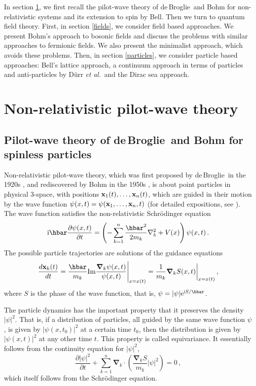 \documentclass[11pt]{article}
\def\pa{\partial}
\def\fr{\frac}
\def\ii{\textrm i}
\def\ee{\textrm e}
\newcommand{\db}{de$\,$Broglie}
\begin{document}
In section \ref{nonrelativistic}, we first recall the pilot-wave theory of \db\ and Bohm for non-relativistic systems and its extension to spin by Bell. Then we turn to quantum field theory. First, in section \ref{fields}, we consider field based approaches. We present Bohm's approach to bosonic fields and discuss the problems with similar approaches to fermionic fields. We also present the minimalist approach, which avoids these problems. Then, in section \ref{particles}, we consider particle based approaches: Bell's lattice approach, a continuum approach in terms of particles and anti-particles by D\"urr {\em et al.}\ and the Dirac sea approach.


\section{Non-relativistic pilot-wave theory}\label{nonrelativistic}
\subsection{Pilot-wave theory of \db\ and Bohm for spinless particles} 
Non-relativistic pilot-wave theory, which was first proposed by \db\ in the 1920s \cite{debroglie28}, and rediscovered by Bohm in the 1950s \cite{bohm52a,bohm52b}, is about point particles in physical 3-space, with positions ${\bf x}_1(t), \dots,{\bf x}_n(t)$, which are guided in their motion by the wave function $\psi(x,t)=\psi({\bf x}_1, \dots,{\bf x}_n,t)$ (for detailed expositions, see \cite{bohm93,holland93b,durr09}). The wave function satisfies the non-relativistic Schr\"odinger equation
\begin{equation}
\ii \hbar \frac{\pa \psi(x,t)}{\pa t}  =  \left( -\sum^n_{k=1} \frac{\hbar^2 }{2m_k}\nabla^2_k + V(x) \right)  \psi(x,t) \,.
\label{1}
\end{equation}
The possible particle trajectories are solutions of the guidance equations 
\begin{equation}
\fr{d {\bf x}_k(t)}{dt} = \frac{\hbar}{m_k} {\textrm{Im}} \frac{{\boldsymbol {\nabla}}_k \psi(x,t)}{\psi(x,t)} \Bigg|_{x=x(t)} = \frac{1}{m_k} {\boldsymbol {\nabla}}_k S(x,t) \bigg|_{x=x(t)} \,,
\label{2}
\end{equation}
where $S$ is the phase of the wave function, that is, $\psi = |\psi|\ee^{\ii S/\hbar}$.

The particle dynamics has the important property that it preserves the density $|\psi|^2$. That is, if a distribution of particles, all guided by the same wave function $\psi$, is given by $|\psi(x,t_0)|^2$ at a certain time $t_0$, then the distribution is given by $|\psi(x,t)|^2$ at any other time $t$. This property is called equivariance. It essentially follows from the continuity equation for $|\psi|^2$,
\begin{equation}
\frac{\pa |\psi|^2}{\pa t} + \sum^n_{k=1}{\boldsymbol {\nabla}}_k \cdot \left( \frac{{\boldsymbol {\nabla}}_k S}{m_k} |\psi|^2 \right) = 0  \,,
\label{2.1}
\end{equation}
which itself follows from the Schr\"odinger equation. 
\end{document}
